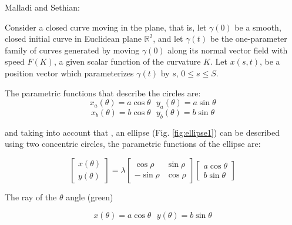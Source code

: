 \documentclass{ws-procs9x6}
\begin{document}
Malladi and Sethian:

Consider a closed curve moving in the plane, that is, let $\gamma (0)$ be a
smooth, closed initial curve in Euclidean plane $\mathbb{R}^{2}$, and let
$\gamma(t)$ be the one-parameter family of curves generated by moving $\gamma
(0)$ along its normal vector field with speed $F(K)$, a given scalar function
of the curvature $K$. Let $x(s,t)$, be a position vector which parameterizes
$\gamma (t)$ by $s$, $0 \leq s \leq S$.



\begin{figure}[h!t!pb]
\centering
{}
\caption{}
\label{fig:circles1}
\end{figure}

The parametric functions that describe the circles are: 
$$x_{a}(\theta) = a \cos\theta \ \ \ y_{a}(\theta)= a \sin\theta$$
$$x_{b}(\theta) = b \cos\theta \ \ \ y_{b}(\theta)= b \sin\theta$$ 

and taking into account that , an ellipse (Fig. \ref{fig:ellipse1})
can be described using two concentric circles, the parametric
functions of the ellipse are:

$$\begin{bmatrix}x(\theta) \\ y(\theta) \end{bmatrix} = \lambda \begin{bmatrix} \cos \rho & \sin \rho \\ -\sin \rho &\cos \rho \end{bmatrix} \begin{bmatrix} a \cos \theta \\ b \sin \theta \end{bmatrix}$$

The ray of the $\theta$ angle (green)

$$x(\theta)= a \cos\theta \ \ \ y(\theta)= b \sin\theta$$
\end{document}
